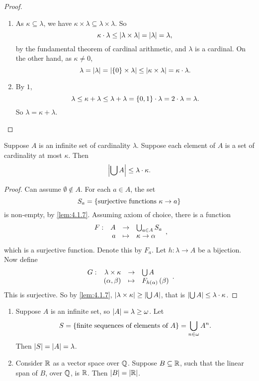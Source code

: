 \begin{proof}
\hfill
\begin{enumerate}
\item As $ \kappa \subseteq \lambda $, we have $ \kappa \times \lambda \subseteq \lambda \times \lambda $. So
$$ \kappa \cdot \lambda \le \left\lvert \lambda \times \lambda \right\rvert = \left\lvert \lambda \right\rvert = \lambda, $$
by the fundamental theorem of cardinal arithmetic, and $ \lambda $ is a cardinal. On the other hand, as $ \kappa \ne 0 $,
$$ \lambda = \left\lvert \lambda \right\rvert = \left\lvert \left\{ 0 \right\} \times \lambda \right\rvert \le \left\lvert \kappa \times \lambda \right\rvert = \kappa \cdot \lambda. $$
\item By $ 1 $,
$$ \lambda \le \kappa + \lambda \le \lambda + \lambda = \left\{ 0, 1 \right\} \cdot \lambda = 2 \cdot \lambda = \lambda. $$
So $ \lambda = \kappa + \lambda $.
\end{enumerate}
\end{proof}

\pagebreak

\begin{theorem}
\label{thm:4.2.6}
Suppose $ A $ is an infinite set of cardinality $ \lambda $. Suppose each element of $ A $ is a set of cardinality at most $ \kappa $. Then
$$ \left\lvert \bigcup A \right\rvert \le \lambda \cdot \kappa. $$
\end{theorem}

\begin{proof}
Can assume $ \emptyset \notin A $. For each $ a \in A $, the set
$$ S_a = \left\{ \text{surjective functions} \ \kappa \to a \right\} $$
is non-empty, by \ref{lem:4.1.7}. Assuming axiom of choice, there is a function
$$ \function[F]{A}{\bigcup_{a \in A} S_a}{a}{\kappa \to \alpha}, $$
which is a surjective function. Denote this by $ F_a $. Let $ h : \lambda \to A $ be a bijection. Now define
$$ \function[G]{\lambda \times \kappa}{\bigcup A}{\rb{\alpha, \beta}}{F_{h\rb{\alpha}}\rb{\beta}}. $$
This is surjective. So by \ref{lem:4.1.7}, $ \left\lvert \lambda \times \kappa \right\rvert \ge \left\lvert \bigcup A \right\rvert $, that is $ \left\lvert \bigcup A \right\rvert \le \lambda \cdot \kappa $.
\end{proof}

\begin{example1}
\hfill
\begin{enumerate}
\item Suppose $ A $ is an infinite set, so $ \left\lvert A \right\rvert = \lambda \ge \omega $. Let
$$ S = \left\{ \text{finite sequences of elements of} \ A \right\} = \bigcup_{n \in \omega} A^n. $$
Then $ \left\lvert S \right\rvert = \left\lvert A \right\rvert = \lambda $.
\item Consider $ \mathbb{R} $ as a vector space over $ \mathbb{Q} $. Suppose $ B \subseteq \mathbb{R} $, such that the linear span of $ B $, over $ \mathbb{Q} $, is $ \mathbb{R} $. Then $ \left\lvert B \right\rvert = \left\lvert \mathbb{R} \right\rvert $.
\end{enumerate}
\end{example1}

